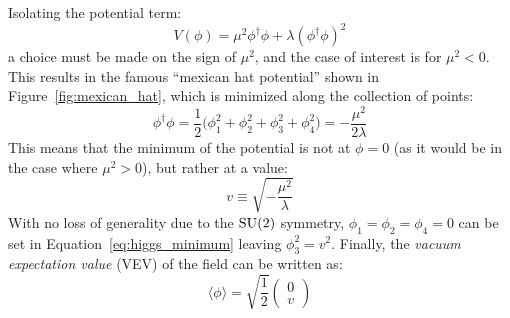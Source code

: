 Isolating the potential term:
\begin{equation}
  V(\phi) = \mu^2\phi^{\dagger}\phi+\lambda(\phi^{\dagger}\phi)^2
  \label{eq:higgs_potential}
\end{equation}
a choice must be made on the sign of $\mu^2$, and the case of interest is for $\mu^2 < 0$. %
This results in the famous ``mexican hat potential'' shown in Figure~\ref{fig:mexican_hat}, which is minimized along the collection of points:
\begin{equation}
  \phi^{\dagger}\phi = \frac{1}{2}\big(\phi_1^2 + \phi_2^2 + \phi_3^2 + \phi_4^2\big) = -\frac{\mu^2}{2\lambda}
  \label{eq:higgs_minimum}
\end{equation}
This means that the minimum of the potential is not at $\phi = 0$ (as it would be in the case where $\mu^2 > 0$), but rather at a value:
\begin{equation}
  v \equiv \sqrt{-\frac{\mu^2}{\lambda}}
  \label{eq:higgs_minimum_value}
\end{equation}
With no loss of generality due to the $\textrm{SU}(2)$ symmetry, $\phi_1 = \phi_2 = \phi_4 = 0$ can be set in Equation~\ref{eq:higgs_minimum} leaving $\phi_3^2 = v^2$.
Finally, the \emph{vacuum expectation value} (VEV) of the field can be written as:
\begin{equation}
  \langle\phi\rangle = \sqrt{\frac{1}{2}}
  \begin{pmatrix}
  0 \\ v
  \end{pmatrix}
  \label{eq:vev}
\end{equation}

